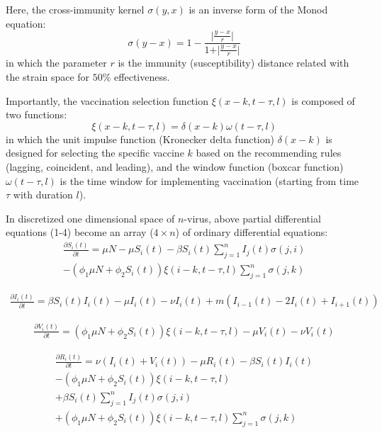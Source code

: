 \documentclass[preprint,12pt]{elsarticle}
\begin{document}
Here, the cross-immunity kernel \(\sigma(y,x)\) is an inverse form of the Monod equation:
\begin{equation}
  \label{eq:Immunity}
  \sigma(y-x) = 1 - \frac{\vert {\frac{y-x}{r}} \vert}{1 + \vert {\frac{y-x}{r}} \vert}
\end{equation}
in which the parameter \(r\) is the immunity (susceptibility) distance related with the strain space for \(50\%\) effectiveness. 

Importantly, the vaccination selection function \(\xi(x-k, t-\tau, l)\) is composed of two functions: 
\begin{equation}
  \label{eq:Selection}
  \xi(x-k, t-\tau, l) =  \delta(x-k) \omega(t-\tau, l)
\end{equation}
in which the unit impulse function (Kronecker delta function) \(\delta(x-k)\) is designed for selecting the specific vaccine \(k\) based on the recommending rules (lagging, coincident, and leading), and the window function (boxcar function) \(\omega(t-\tau, l)\) is the time window for implementing vaccination (starting from time \(\tau\) with duration \(l\)).


\newpage
In discretized one dimensional space of \(n\)-virus, above partial differential equations (1-4) become an array (\(4 \times n\)) of ordinary differential equations:
\begin{align}
  \label{eq:S}
  \frac{\partial S_i(t)}{\partial t} = \mu N - \mu S_i(t) - \beta S_i(t) \sum_{j=1}^{n} I_j(t)\sigma(j,i)
 \nonumber\\
  -(\phi_{1}\mu N + \phi_{2} S_i(t)) \xi(i-k, t-\tau, l) \sum_{j=1}^{n} \sigma(j,k)
\end{align}

\begin{align}
  \label{eq:I}
  \frac{\partial I_i(t)}{\partial t} = \beta S_i(t) I_i(t) - \mu I_i(t) - \nu I_i(t) + m(I_{i-1}(t) - 2I_{i}(t) + I_{i+1}(t))
\end{align}

\begin{align}
  \label{eq:V}
  \frac{\partial V_i(t)}{\partial t} = (\phi_{1}\mu N + \phi_{2} S_i(t)) \xi(i-k, t-\tau, l) - \mu V_i(t) - \nu V_i(t)
\end{align}

\begin{align}
  \label{eq:R}
  \frac{\partial R_i(t)}{\partial t} = \nu (I_i(t) + V_i(t)) - \mu R_i(t) - \beta S_i(t) I_i(t) 
   \nonumber\\
   -(\phi_{1}\mu N + \phi_{2} S_i(t)) \xi(i-k, t-\tau, l)
   \nonumber\\
  +\beta S_i(t)\sum_{j=1}^{n} I_j(t)\sigma(j,i)
  \nonumber\\
  +(\phi_{1}\mu N + \phi_{2} S_i(t)) \xi(i-k, t-\tau, l) \sum_{j=1}^{n} \sigma(j,k)
\end{align}
\end{document}
